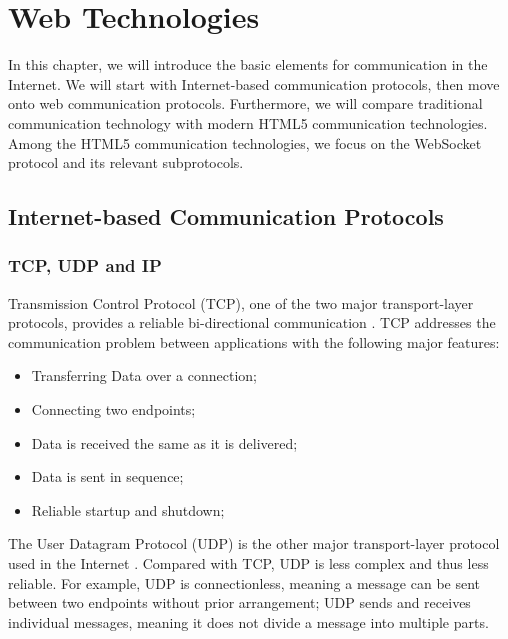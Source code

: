 \chapter{Web Technologies}
\label{chapter:WebTechnologies} 

In this chapter, we will introduce the basic elements for communication in the Internet. We will start with Internet-based communication protocols, then move onto web communication protocols. Furthermore, we will compare traditional communication technology with modern HTML5 communication technologies. Among the HTML5 communication technologies, we focus on the WebSocket protocol and its relevant subprotocols.

\section{Internet-based Communication Protocols}

\subsection{TCP, UDP and IP}
Transmission Control Protocol (TCP), one of the two major transport-layer protocols, provides a reliable bi-directional communication \cite{comer2008computer}. TCP addresses the communication problem between applications with the following major features: 

\begin{itemize}
\setlength{\itemsep}{0pt}
\item Transferring Data over a connection;
\item Connecting two endpoints;
\item Data is received the same as it is delivered;
\item Data is sent in sequence;
\item Reliable startup and shutdown;
\end{itemize}

The User Datagram Protocol (UDP) is the other major transport-layer protocol used in the Internet \cite{comer2008computer}. Compared with TCP, UDP is less complex and thus less reliable. For example, UDP is connectionless, meaning a message can be sent between two endpoints without prior arrangement; UDP sends and receives individual messages, meaning it does not divide a message into multiple parts.

